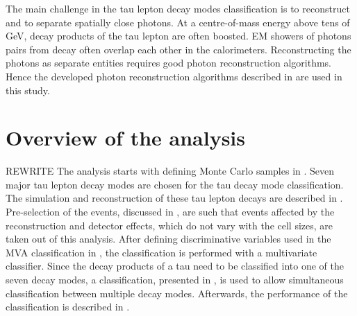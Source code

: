The main challenge in the tau lepton decay modes  classification is to reconstruct and to separate spatially close photons. At a centre-of-mass energy above tens of GeV, decay products of the tau lepton are often boosted.  EM showers of photons pairs from \Ppizero decay often overlap each other in the calorimeters.  Reconstructing the photons as separate entities requires good photon reconstruction algorithms. Hence the developed photon reconstruction algorithms described in  are used in this study.







%



\section{Overview of the analysis}

REWRITE
The analysis starts with defining Monte Carlo samples in . Seven major tau lepton decay modes are chosen for the tau decay mode classification. The simulation and reconstruction of these tau lepton decays are described in .  Pre-selection of the events, discussed in , are such that events affected by the reconstruction and detector effects, which do not vary with the \ECAL cell sizes, are taken out of this analysis. After defining discriminative variables used in the MVA classification in , the classification is performed with a multivariate classifier. Since the decay products of a tau need to be classified into one of the seven decay modes, a \multiclass classification, presented in , is used to allow simultaneous classification between  multiple decay modes. Afterwards, the performance of the classification is described in .

